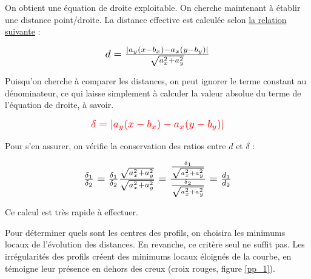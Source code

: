\documentclass[12pt]{article}
\begin{document}
    On obtient une équation de droite exploitable. On cherche maintenant à établir une distance point/droite. La distance effective est calculée selon \href{https://fr.wikipedia.org/wiki/Distance_d%27un_point_%C3%A0_une_droite#Dans_le_plan}{la relation suivante} :

    \begin{spacing}{1}
        \begin{equation}
            \scalebox{1.25}{$d = \frac{|a_y(x - b_x) - a_x(y - b_y)|}{\sqrt{a_x^2 + a_y^2}}$}
        \end{equation}
    \end{spacing}

    Puisqu'on cherche à comparer les distances, on peut ignorer le terme constant au dénominateur, ce qui laisse simplement à calculer la valeur absolue du terme de l'équation de droite, à savoir.

    \begin{spacing}{1}
        \begin{equation}
            \scalebox{1.25}{$\textcolor{red}{\delta = |a_y(x - b_x) - a_x(y - b_y)|}$}
        \end{equation}
    \end{spacing}

    Pour s'en assurer, on vérifie la conservation des ratios entre $d$ et $\delta$ :

    \begin{spacing}{1}
        \begin{equation}
            \scalebox{1.25}{$\frac{\delta_1}{\delta_2} = \frac{\delta_1}{\delta_2}\frac{\sqrt{a_x^2 + a_y^2}}{\sqrt{a_x^2 + a_y^2}} = \frac{\frac{\delta_1}{\sqrt{a_x^2 + a_y^2}}}{\frac{\delta_2}{\sqrt{a_x^2 + a_y^2}}} = \frac{d_1}{d_2}$}
        \end{equation}
    \end{spacing}

    Ce calcul est très rapide à effectuer.
    
    Pour déterminer quels sont les centres des profils, on choisira les minimums locaux de l'évolution des distances. En revanche, ce critère seul ne suffit pas. Les irrégularités des profils créent des minimums locaux éloignés de la courbe, en témoigne leur présence en dehors des creux (croix rouges, figure \ref{pp_1}).
\end{document}
